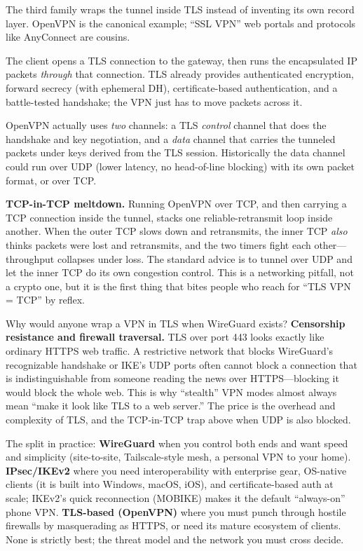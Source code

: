 The third family wraps the tunnel inside TLS instead of inventing its own record layer. OpenVPN is the canonical example; ``SSL VPN'' web portals and protocols like AnyConnect are cousins.

The client opens a TLS connection to the gateway, then runs the encapsulated IP packets \emph{through} that connection. TLS already provides authenticated encryption, forward secrecy (with ephemeral DH), certificate-based authentication, and a battle-tested handshake; the VPN just has to move packets across it.

OpenVPN actually uses \emph{two} channels: a TLS \emph{control} channel that does the handshake and key negotiation, and a \emph{data} channel that carries the tunneled packets under keys derived from the TLS session. Historically the data channel could run over UDP (lower latency, no head-of-line blocking) with its own packet format, or over TCP.

\begin{trapbox}
\textbf{TCP-in-TCP meltdown.} Running OpenVPN over TCP, and then carrying a TCP connection inside the tunnel, stacks one reliable-retransmit loop inside another. When the outer TCP slows down and retransmits, the inner TCP \emph{also} thinks packets were lost and retransmits, and the two timers fight each other---throughput collapses under loss. The standard advice is to tunnel over UDP and let the inner TCP do its own congestion control. This is a networking pitfall, not a crypto one, but it is the first thing that bites people who reach for ``TLS VPN = TCP'' by reflex.
\end{trapbox}

\begin{intuitionbox}
Why would anyone wrap a VPN in TLS when WireGuard exists? \textbf{Censorship resistance and firewall traversal.} TLS over port 443 looks exactly like ordinary HTTPS web traffic. A restrictive network that blocks WireGuard's recognizable handshake or IKE's UDP ports often cannot block a connection that is indistinguishable from someone reading the news over HTTPS---blocking it would block the whole web. This is why ``stealth'' VPN modes almost always mean ``make it look like TLS to a web server.'' The price is the overhead and complexity of TLS, and the TCP-in-TCP trap above when UDP is also blocked.
\end{intuitionbox}

\begin{applicationbox}
The split in practice: \textbf{WireGuard} when you control both ends and want speed and simplicity (site-to-site, Tailscale-style mesh, a personal VPN to your home). \textbf{IPsec/IKEv2} where you need interoperability with enterprise gear, OS-native clients (it is built into Windows, macOS, iOS), and certificate-based auth at scale; IKEv2's quick reconnection (MOBIKE) makes it the default ``always-on'' phone VPN. \textbf{TLS-based (OpenVPN)} where you must punch through hostile firewalls by masquerading as HTTPS, or need its mature ecosystem of clients. None is strictly best; the threat model and the network you must cross decide.
\end{applicationbox}

